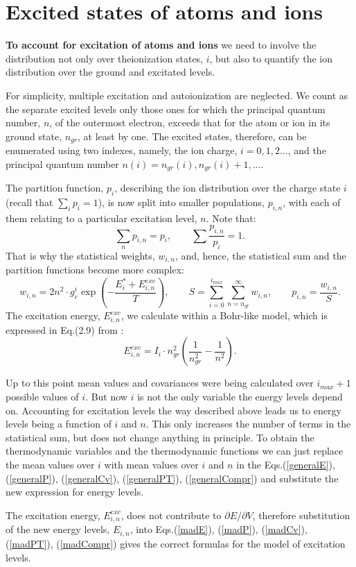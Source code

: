 \section{Excited states of atoms and ions}
{\bf To account for excitation of atoms and ions} we need to involve the
distribution not only over theionization states, $i$, but also to quantify the
ion distribution over the ground and 
excitated levels. 

For simplicity,  multiple excitation and autoionization are neglected. We
count as the separate excited levels only those ones for which the principal 
quantum number, 
$n$, of the outermost electron, exceeds that for the atom or ion in its ground state, 
$n_{gr}$, at least by one. The excited states, therefore, can be enumerated using two indexes,
namely, the ion charge, $i=0,1,2...$, and the principal quantum number 
$n(i)=n_{gr}(i),n_{gr}(i)+1,...$. 

The partition function, $p_i$, describing the ion distribution over the charge state $i$ 
(recall that $\sum_i{p_i}=1$), 
is now split into smaller populations, $p_{i,n}$, with each of them relating to a particular 
excitation level, $n$. Note that:
\begin{equation}
\sum_n{p_{i,n}}=p_i,\qquad \sum{\frac{p_{i,n}}{p_i}}=1.
\end{equation}
That is why the statistical weights, $w_{i,n}$, and, hence, the statistical sum and the partition functions
become more complex:
\begin{equation}
w_{i,n} = 2 n^2 \cdot g_e^i \exp \left( -\frac{E^*_i + E^{exc}_{i,n}}{T} \right),\qquad
S = \sum_{i=0}^{i_{max}} \sum_{n=n_{gr}}^{\infty} w_{i,n},\qquad
p_{i,n} = \frac{w_{i,n}}{S}.
\end{equation}
The excitation energy, $E^{exc}_{i,n}$, we calculate within a Bohr-like model, which is expressed in
Eq.(2.9) from \cite{ionmix}:
\begin{equation}
E^{exc}_{i,n} = I_i \cdot n_{gr}^2 \left( \frac1{n_{gr}^2} - \frac1{n^2} \right).
\end{equation}

Up to this point mean values and covariances were being calculated over $i_{max}+1$ possible
values of $i$. But now $i$ is not the only variable the energy levels depend on.
Accounting for excitation levels the way described above leads us to energy levels
being a function of $i$ and $n$.
This only increases the number of terms in the statistical sum, but does not change
anything in principle. To obtain the thermodynamic variables and the thermodynamic functions
we can just replace the mean values over $i$ with mean values over $i$ and $n$ in the
Eqs.(\ref{generalE}), (\ref{generalP}), (\ref{generalCv}),
(\ref{generalPT}), (\ref{generalCompr}) and substitute the new expression for energy levels.

The excitation energy, $E^{exc}_{i,n}$, does not contribute to $\partial E / \partial V$,
therefore substitution of the new energy levels, $E_{i,n}$, into
Eqs.(\ref{madE}), (\ref{madP}), (\ref{madCv}), (\ref{madPT}), (\ref{madCompr})
gives the correct formulas for the model of excitation levels.
